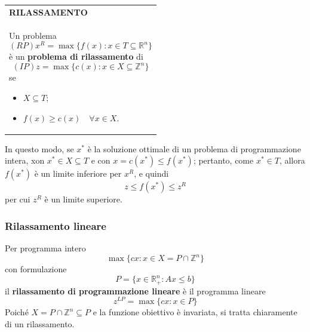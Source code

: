 \documentclass[a4paper]{extarticle}
\renewcommand\arraystretch{}
\begin{document}
\vspace{1em}
\setlength{\tabcolsep}{14pt}
\renewcommand{\arraystretch}{2}
\noindent
\begin{tabularx}{\textwidth}{@{}|P|@{}}
    \hline
    {\textbf{RILASSAMENTO}}\\
    \parbox{\linewidth}{Un problema
    \[(RP) x^R = \max \{f(x) : x \in T \subseteq \mathbb{R}^n\}\]
    è un \textbf{problema di rilassamento} di
    \[(IP)z = \max \{c(x) :  x \in X \subseteq \mathbb{Z}^n\}\]
    se
    \begin{itemize}
        \item $X \subseteq T$;
        \item $f(x) \geq c(x) \hspace{1em} \forall x \in X$.
    \end{itemize}
    \vspace{1mm}}\\
    \hline
\end{tabularx}

\vspace{1em}
In questo modo, se $x^*$ è la soluzione ottimale di un problema di programmazione intera, xon $x^* \in X \subseteq T$ e con $x = c(x^*) \leq f(x^*)$; pertanto, come $x^* \in T$, allora $f(x^*)$ è un limite inferiore per $x^R$, e quindi
\[z \leq f(x^*) \leq z^R\]
per cui $z^R$ è un limite superiore.

\vspace{1em}
\subsubsection{Rilassamento lineare}
Per programma intero
\[\max\{cx : x \in X = P \cap \mathbb{Z}^n\}\]
con formulazione
\[P = \{x \in \mathbb{R}_+^n : Ax \leq b\}\]
il \textbf{rilassamento di programmazione lineare} è il programma lineare
\[z^{LP} = \max\{cx : x \in P\}\]
Poiché $X = P \cap \mathbb{Z}^n \subseteq P$ e la funzione obiettivo è invariata, si tratta chiaramente di un rilassamento.
\end{document}
